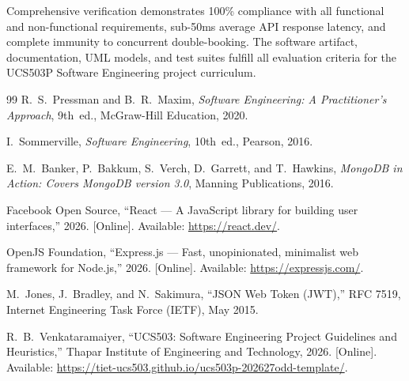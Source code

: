 \documentclass[11pt,a4paper]{article}
\begin{document}
Comprehensive verification demonstrates 100\% compliance with all functional and non-functional requirements, sub-50ms average API response latency, and complete immunity to concurrent double-booking. The software artifact, documentation, UML models, and test suites fulfill all evaluation criteria for the UCS503P Software Engineering project curriculum.

\begin{thebibliography}{99}
R.~S.~Pressman and B.~R.~Maxim, \emph{Software Engineering: A Practitioner's Approach}, 9th~ed., McGraw-Hill Education, 2020.

I.~Sommerville, \emph{Software Engineering}, 10th~ed., Pearson, 2016.

E.~M.~Banker, P.~Bakkum, S.~Verch, D.~Garrett, and T.~Hawkins, \emph{MongoDB in Action: Covers MongoDB version 3.0}, Manning Publications, 2016.

Facebook Open Source, ``React --- A JavaScript library for building user interfaces,'' 2026. [Online]. Available: \url{https://react.dev/}.

OpenJS Foundation, ``Express.js --- Fast, unopinionated, minimalist web framework for Node.js,'' 2026. [Online]. Available: \url{https://expressjs.com/}.

M.~Jones, J.~Bradley, and N.~Sakimura, ``JSON Web Token (JWT),'' RFC 7519, Internet Engineering Task Force (IETF), May 2015.

R.~B.~Venkataramaiyer, ``UCS503: Software Engineering Project Guidelines and Heuristics,'' Thapar Institute of Engineering and Technology, 2026. [Online]. Available: \url{https://tiet-ucs503.github.io/ucs503p-202627odd-template/}.
\end{thebibliography}
\end{document}
